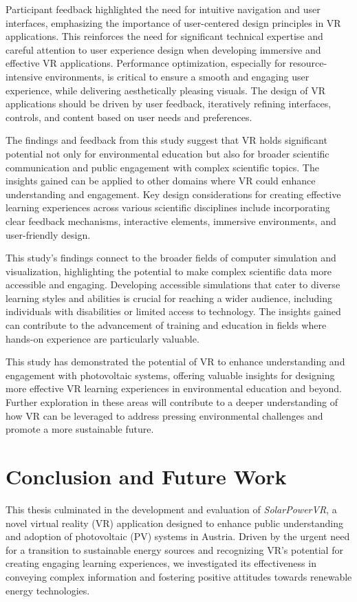 \documentclass[draft, final]{vutinfth} %
\begin{document}
Participant feedback highlighted the need for intuitive navigation and user interfaces, emphasizing the importance of user-centered design principles in VR applications.  This reinforces the need for significant technical expertise and careful attention to user experience design when developing immersive and effective VR applications. Performance optimization, especially for resource-intensive environments, is critical to ensure a smooth and engaging user experience, while delivering aesthetically pleasing visuals. The design of VR applications should be driven by user feedback, iteratively refining interfaces, controls, and content based on user needs and preferences.

The findings and feedback from this study suggest that VR holds significant potential not only for environmental education but also for broader scientific communication and public engagement with complex scientific topics. The insights gained can be applied to other domains where VR could enhance understanding and engagement. Key design considerations for creating effective learning experiences across various scientific disciplines include incorporating clear feedback mechanisms, interactive elements, immersive environments, and user-friendly design.

This study's findings connect to the broader fields of computer simulation and visualization, highlighting the potential to make complex scientific data more accessible and engaging.  Developing accessible simulations that cater to diverse learning styles and abilities is crucial for reaching a wider audience, including individuals with disabilities or limited access to technology. The insights gained can contribute to the advancement of training and education in fields where hands-on experience are particularly valuable.

This study has demonstrated the potential of VR to enhance understanding and engagement with photovoltaic systems, offering valuable insights for designing more effective VR learning experiences in environmental education and beyond. Further exploration in these areas will contribute to a deeper understanding of how VR can be leveraged to address pressing environmental challenges and promote a more sustainable future.
\chapter{Conclusion and Future Work}

This thesis culminated in the development and evaluation of \textit{SolarPowerVR}, a novel virtual reality (VR) application designed to enhance public understanding and adoption of photovoltaic (PV) systems in Austria. Driven by the urgent need for a transition to sustainable energy sources and recognizing VR's potential for creating engaging learning experiences, we investigated its effectiveness in conveying complex information and fostering positive attitudes towards renewable energy technologies.
\end{document}
